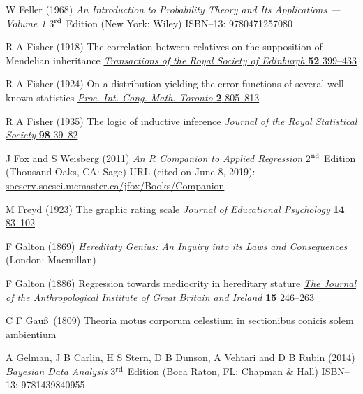 \begin{thebibliography}{99}
W Feller
(1968) \textit{An Introduction to Probability Theory and Its 
Applications --- Volume 1} 3$^{\rm rd}$ Edition (New York: Wiley)
ISBN--13: 9780471257080

R A Fisher
(1918) The correlation between relatives on the supposition of 
Mendelian inheritance
\href{http://digital.library.adelaide.edu.au/dspace/bitstream/2440/15097/1/9.pdf}{\textit{Transactions of the Royal Society of 
Edinburgh} \textbf{52} 399--433}

R A Fisher
(1924) On a distribution yielding the error functions of several 
well known statistics
\href{http://www.mathunion.org/ICM/ICM1924.2/Main/icm1924.2.0805.0814.ocr.pdf}{\textit{Proc. Int. Cong. Math. Toronto} \textbf{2} 805--813}

R A Fisher
(1935) The logic of inductive inference
\href{http://www.jstor.org/stable/2342435}{\textit{Journal of the 
Royal Statistical Society} \textbf{98} 39--82}

J Fox and S Weisberg
(2011) \textit{An {R} Companion to Applied Regression}
2$^{\rm nd}$ Edition (Thousand Oaks, CA: Sage) URL (cited on
June 8, 2019): \href{http://socserv.socsci.mcmaster.ca/jfox/Books/Companion}{socserv.socsci.mcmaster.ca/jfox/Books/Companion}

M Freyd
(1923) The graphic rating scale 
\href{http://dx.doi.org/10.1037/h0074329}{\textit{Journal of 
Educational Psychology} \textbf{14} 83--102}

F Galton (1869) \textit{Hereditaty Genius: An Inquiry into its Laws 
and Consequences} (London: Macmillan)

F Galton
(1886) Regression towards mediocrity in hereditary stature 
\href{http://dx.doi.org/10.2307/2841583}{\textit{The Journal of the 
Anthropological Institute of Great Britain and Ireland} \textbf{15} 
246--263}

C F Gau\ss\
(1809) Theoria motus corporum celestium in sectionibus conicis 
solem ambientium

A Gelman, J B Carlin, H S Stern, D B Dunson, A Vehtari and D B 
Rubin
(2014) \textit{Bayesian Data Analysis}
3$^{\rm rd}$ Edition (Boca Raton, FL: Chapman \& Hall)
ISBN--13: 9781439840955


\end{thebibliography}
